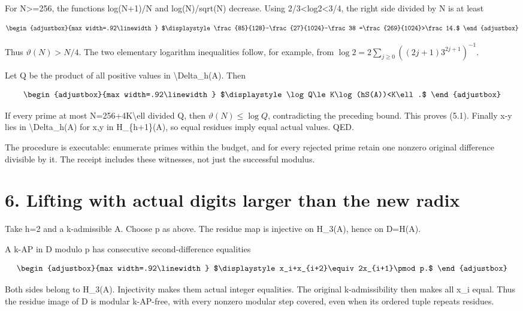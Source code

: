 For N\textgreater=256, the functions log(N+1)/N and log(N)/sqrt(N) decrease. Using 2/3\textless log2\textless3/4, the right side divided by N is at least

\[
\begin{adjustbox}{max width=.92\linewidth}
$\displaystyle \frac{85}{128}-\frac{27}{1024}-\frac38
=\frac{269}{1024}>\frac14.$
\end{adjustbox}
\]

Thus \(\vartheta(N)>N/4\). The two elementary logarithm inequalities follow, for example, from \(\log2=2\sum_{j\ge0}((2j+1)3^{2j+1})^{-1}\).

Let Q be the product of all positive values in \textbackslash Delta\_h(A). Then

\[
\begin{adjustbox}{max width=.92\linewidth}
$\displaystyle \log Q\le K\log(hS(A))<K\ell.$
\end{adjustbox}
\]

If every prime at most N=256+4K\textbackslash ell divided Q, then \(\vartheta(N)\le\log Q\), contradicting the preceding bound. This proves (5.1). Finally x-y lies in \textbackslash Delta\_h(A) for x,y in H\_\{h+1\}(A), so equal residues imply equal actual values. QED.

The procedure is executable: enumerate primes within the budget, and for every rejected prime retain one nonzero original difference divisible by it. The receipt includes these witnesses, not just the successful modulus.

\section{6. Lifting with actual digits larger than the new radix}\label{n22-lifting-with-actual-digits-larger-than-the-new-radix}

Take h=2 and a k-admissible A. Choose p as above. The residue map is injective on H\_3(A), hence on D=H(A).

A k-AP in D modulo p has consecutive second-difference equalities

\[
\begin{adjustbox}{max width=.92\linewidth}
$\displaystyle x_i+x_{i+2}\equiv2x_{i+1}\pmod p.$
\end{adjustbox}
\]

Both sides belong to H\_3(A). Injectivity makes them actual integer equalities. The original k-admissibility then makes all x\_i equal. Thus the residue image of D is modular k-AP-free, with every nonzero modular step covered, even when its ordered tuple repeats residues.

